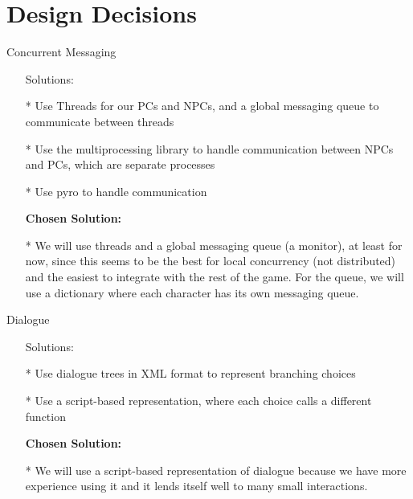 \documentclass{article}
\theoremstyle{definition}
\begin{document}
\section*{Design Decisions}

Concurrent Messaging
	\begin{enumerate}
	\item[ ] Solutions:
	\item[*] Use Threads for our PCs and NPCs, and a global messaging
	      queue to communicate between threads
	\item[*] Use the multiprocessing library to handle communication between
		  NPCs and PCs, which are separate processes
	\item[*] Use pyro to handle communication
	\item[ ] \textbf{Chosen Solution:}
	\item[*] We will use threads and a global messaging queue (a monitor), at 
	      least for now,
	      since this seems to be the best for local concurrency (not distributed)
	      and the easiest to integrate with the rest of the game. For the queue,
	      we will use a dictionary where each character has its own messaging 
	      queue.
	\end{enumerate}
Dialogue
	\begin{enumerate}
	\item[ ] Solutions:
	\item[*] Use dialogue trees in XML format to represent branching choices
	\item[*] Use a script-based representation, where each choice calls a 
		  different function
	\item[ ] \textbf{Chosen Solution:}
	\item[*] We will use a script-based representation of dialogue because we have
		  more experience using it and it lends itself well to many small interactions.
	\end{enumerate}
\end{document}
